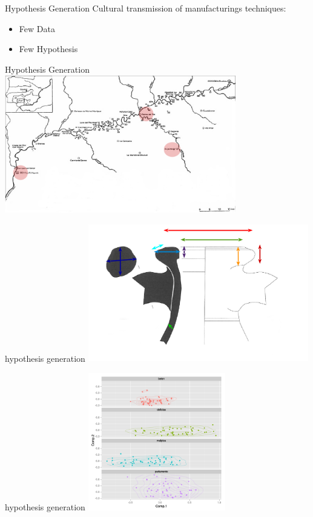 \documentclass[12pt, notes=show]{beamer}
\begin{document}
\begin{frame}{Hypothesis Generation}
    Cultural transmission of manufacturings techniques:
    \begin{itemize}
	\item Few Data
	\item Few Hypothesis 
    \end{itemize}
\end{frame}



\begin{frame}{Hypothesis Generation}
    \includegraphics[height=6cm]{images/Beti.png}
\end{frame}

\begin{frame}{hypothesis generation}
\includegraphics[height=6cm]{images/mesures.png}
    
\end{frame}

\begin{frame}{hypothesis generation}
	\includegraphics[height=6cm]{images/pca.png}
\end{frame}
\end{document}

